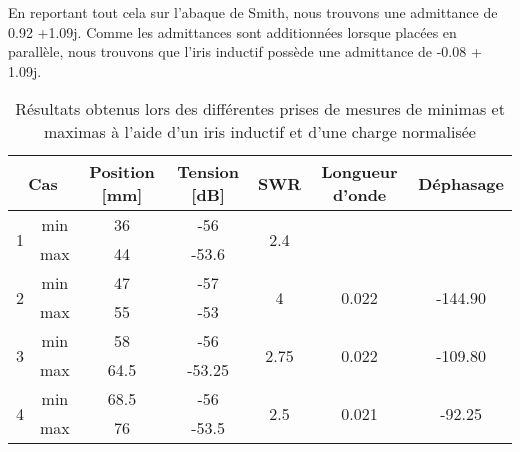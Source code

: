 En reportant tout cela sur l'abaque de Smith, nous trouvons une admittance de 0.92 +1.09j. Comme les admittances sont additionnées lorsque placées en parallèle, nous trouvons que l'iris inductif possède une admittance de -0.08 + 1.09j.

  \begin{table}[htbp]
    \centering
    \begin{tabular}{|c|c||c|c|c|c|c|} \hline
    \multicolumn{2}{|c||}{Cas}   & Position [mm] & Tension [dB] & SWR & Longueur d'onde & Déphasage\\ \hline\hline
\multirow{2}{*}{1} & min & 36 & -56 & \multirow{2}{*}{2.4} & &\\ 
 & max & 44 & -53.6 &  & \\ \hline
\multirow{2}{*}{2} & min & 47 & -57 & \multirow{2}{*}{4} & \multirow{2}{*}{0.022} &\multirow{2}{*}{-144.90}\\
 & max & 55 & -53 &  & \\ \hline
\multirow{2}{*}{3} & min & 58 & -56 & \multirow{2}{*}{2.75} & \multirow{2}{*}{0.022}&\multirow{2}{*}{-109.80}\\ 
 & max & 64.5 & -53.25 &  & \\ \hline
\multirow{2}{*}{4} & min & 68.5 & -56 & \multirow{2}{*}{2.5} & \multirow{2}{*}{0.021}&\multirow{2}{*}{-92.25}\\ 
 & max & 76 & -53.5 &  & \\  \hline
    \end{tabular}%
        \caption{Résultats obtenus lors des différentes prises de mesures de minimas et maximas à l'aide d'un iris inductif et d'une charge normalisée}
    \label{tab:5}%
\end{table}%